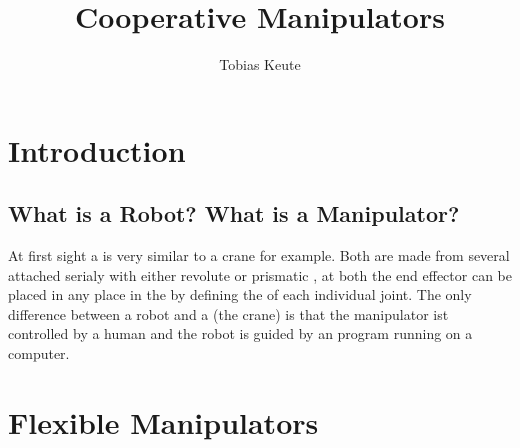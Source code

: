 \documentclass[11pt,english,a4paper,]{scrartcl}
\title{Cooperative Manipulators}
\author{Tobias Keute}
\begin{document}
\vfill
\maketitle
\vfill
\pagebreak
\tableofcontents
\pagebreak
\section{Introduction}
	\subsection{What is a Robot? What is a Manipulator?}
	At first sight a  is very similar to a crane for example. Both are made from several  attached serialy with either revolute or prismatic , at both the end effector can be placed in any place in the  by defining the  of each individual joint. The only difference between a robot and a  (the crane) is that the manipulator ist controlled by a human and the robot is guided by an program running on a computer.
%	
%
%	
%	
\section{Flexible Manipulators}
	
	\pagebreak
	
\end{document}
